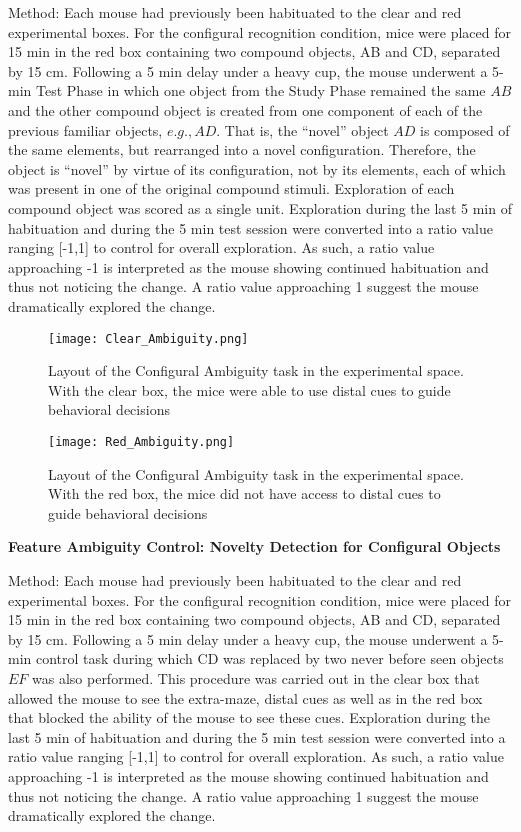 \documentclass{article}
\begin{document}
Method:
Each mouse had previously been habituated to the clear and red experimental boxes. For the configural recognition condition, mice were placed for 15 min in the red box containing two compound objects, AB and CD, separated by 15 cm. Following a 5 min delay under a heavy cup, the mouse underwent a 5-min Test Phase in which one object from the Study Phase remained the same \(AB\) and the other compound object is created from one component of each of the previous familiar objects, \(e.g., AD\). That is, the “novel” object \(AD\) is composed of the same elements, but rearranged into a novel configuration. Therefore, the object is “novel” by virtue of its configuration, not by its elements, each of which was present in one of the original compound stimuli. Exploration of each compound object was scored as a single unit. Exploration during the last 5 min of habituation and during the 5 min test session were converted into a ratio value ranging [-1,1] to control for overall exploration. As such, a ratio value approaching -1 is interpreted as the mouse showing continued habituation and thus not noticing the change. A ratio value approaching 1 suggest the mouse dramatically explored the change.


\begin{figure}[h!]
\centering
\texttt{[image: Clear\_Ambiguity.png]}
\caption{Layout of the Configural Ambiguity task in the experimental space. With the clear box, the mice were able to use distal cues to guide behavioral decisions}
\label{fig:Ambiguity}
\end{figure}

\begin{figure}[h!]
\centering
\texttt{[image: Red\_Ambiguity.png]}
\caption{Layout of the Configural Ambiguity task in the experimental space. With the red box, the mice did not have access to distal cues to guide behavioral decisions}
\label{fig:Ambiguity}
\end{figure}


\textbf{Feature Ambiguity Control: Novelty Detection for Configural Objects}

Method:
Each mouse had previously been habituated to the clear and red experimental boxes. For the configural recognition condition, mice were placed for 15 min in the red box containing two compound objects, AB and CD, separated by 15 cm. Following a 5 min delay under a heavy cup, the mouse underwent a 5-min control task during which CD was replaced by two never before seen objects \(EF\) was also performed. This procedure was carried out in the clear box that allowed the mouse to see the extra-maze, distal cues as well as in the red box that blocked the ability of the mouse to see these cues. Exploration during the last 5 min of habituation and during the 5 min test session were converted into a ratio value ranging [-1,1] to control for overall exploration. As such, a ratio value approaching -1 is interpreted as the mouse showing continued habituation and thus not noticing the change. A ratio value approaching 1 suggest the mouse dramatically explored the change.
\end{document}
